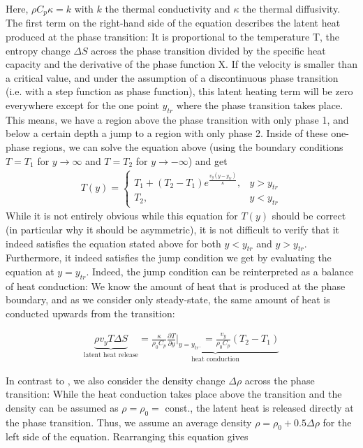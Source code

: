 \documentclass{article}
\begin{document}
Here, $\rho C_p \kappa = k$ with $k$ the thermal conductivity and $\kappa$ the
thermal diffusivity.
The first term on the right-hand side of the equation describes the latent heat
produced at the phase transition: It is proportional to the temperature T, the
entropy change $\Delta S$ across the phase transition divided by the specific
heat capacity and the derivative of the phase function X. If the velocity is
smaller than a critical value, and under the assumption of a discontinuous phase
transition (i.e. with a step function as phase function), this latent heating
term will be zero everywhere except for the one point $y_{tr}$ where the phase
transition takes place. This means, we have a region above the phase transition
with only phase 1, and below a certain depth a jump to a region with only phase
2. Inside of these one-phase regions, we can solve the equation above (using the
boundary conditions $T=T_1$ for $y \rightarrow \infty $ and $T=T_2$ for $y
\rightarrow -\infty $) and get
\begin{align*}
T(y) =\begin{cases}
T_1 + (T_2-T_1) e^{\frac{v_y (y-y_{tr})}{\kappa}}, & y>y_{tr}\\
T_2, & y<y_{tr}
\end{cases}
\end{align*}
While it is not entirely obvious while this equation for $T(y)$ should be
correct (in particular why it should be asymmetric), it is not difficult to
verify that it indeed satisfies the equation stated above for both $y<y_{tr}$
and $y>y_{tr}$. Furthermore, it indeed satisfies the jump condition we get by
evaluating the equation at $y=y_{tr}$.
Indeed, the jump condition can be reinterpreted as a balance of heat conduction:
We know the amount of heat that is produced at the phase boundary, and as
we consider only steady-state, the same amount of heat is conducted upwards from
the transition:

\begin{gather*}
\underbrace{\rho v_y T \Delta S}_{\text{latent heat release}} = \underbrace{\frac{\kappa}{\rho_0 C_p} \frac{\partial T}{\partial y} \vert_{y=y_{tr^-}} = \frac{v_y}{\rho_0 C_p} (T_2-T_1)}_{\text{heat conduction}}
\end{gather*}

In contrast to \cite{STO01}, we also consider the density change $\Delta\rho$ across the phase transition: While the heat conduction takes place above the transition and the density can be assumed as $\rho=\rho_0=$ const., the latent heat is released directly at the phase transition. Thus, we assume an average density $\rho=\rho_0 + 0.5\Delta\rho$ for the left side of the equation. Rearranging this equation gives
\end{document}
